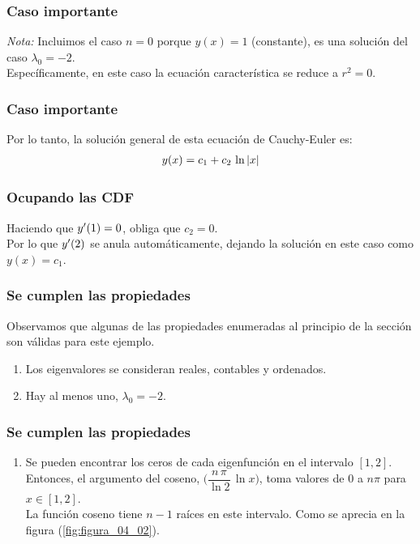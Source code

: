 \documentclass[12pt]{beamer}
\begin{document}
\begin{frame}
\frametitle{Caso importante}
\emph{Nota:} Incluimos el caso $n = 0$ porque \break \hfill $y (x) = 1$ (constante), es una solución del caso \break \hfill $\lambda_{0} = - 2$.
\\
\bigskip
\pause
Específicamente, en este caso la ecuación característica se reduce a $r^{2} = 0$.
\end{frame}
\begin{frame}
\frametitle{Caso importante}
Por lo tanto, la solución general de esta ecuación de Cauchy-Euler es:
\pause
\begin{align*}
y (x) = c_{1} + c_{2} \, \ln \abs{x}
\end{align*}
\end{frame}
\begin{frame}
\frametitle{Ocupando las CDF}
Haciendo que ${y}^{\prime} (1) = 0$, obliga que $c_{2} = 0$.
\\
\bigskip
\pause
Por lo que ${y}^{\prime} (2)$ se anula automáticamente, dejando la solución en este caso como $y(x) = c_{1}$.
\end{frame}
\begin{frame}
\frametitle{Se cumplen las propiedades}
Observamos que algunas de las propiedades enumeradas al principio de la sección son válidas para este ejemplo.
\pause
{}
\begin{enumerate}[<+->]
\item Los eigenvalores se consideran reales, contables y ordenados.
\item Hay al menos uno, $\lambda_{0} = -2$.
\seti
\end{enumerate}
\end{frame}
\begin{frame}
\frametitle{Se cumplen las propiedades}
\begin{enumerate}[<+->]
\conti
\item Se pueden encontrar los ceros de cada eigenfunción en el intervalo $[1, 2]$. \pause Entonces, el argumento del coseno, $\bigg( \dfrac{n \, \pi}{\ln 2} \, \ln x \bigg)$, toma valores de $0$ a $n \pi$ para $x \in [1, 2]$. 
\\
\bigskip
\pause
La función coseno tiene $n - 1$ raíces en este intervalo. Como se aprecia en la figura (\ref{fig:figura_04_02}).
\seti
\end{enumerate}
\end{frame}
\end{document}
